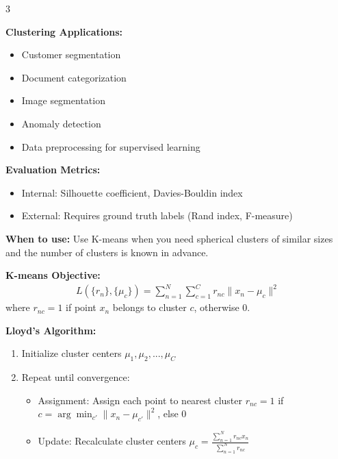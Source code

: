 \documentclass[10pt,landscape]{article}
\begin{document}
\begin{multicols}{3}
\begin{tcolorbox}[breakable, title=5. Clustering Concepts, colback=clustering]
\textbf{Clustering Applications:}
\begin{itemize}[leftmargin=*,noitemsep,topsep=0pt]
    \item Customer segmentation
    \item Document categorization
    \item Image segmentation
    \item Anomaly detection
    \item Data preprocessing for supervised learning
\end{itemize}

\textbf{Evaluation Metrics:}
\begin{itemize}[leftmargin=*,noitemsep,topsep=0pt]
    \item Internal: Silhouette coefficient, Davies-Bouldin index
    \item External: Requires ground truth labels (Rand index, F-measure)
\end{itemize}
\end{tcolorbox}

\begin{tcolorbox}[breakable, title=5.1 K-means Clustering, colback=clustering]
\textbf{When to use:} Use K-means when you need spherical clusters of similar sizes and the number of clusters is known in advance.

\textbf{K-means Objective:}
\begin{align}
L(\{r_n\}, \{\mu_c\}) = \sum_{n=1}^N\sum_{c=1}^C r_{nc}\|x_n - \mu_c\|^2
\end{align}
where $r_{nc} = 1$ if point $x_n$ belongs to cluster $c$, otherwise 0.

\textbf{Lloyd's Algorithm:}
\begin{enumerate}[leftmargin=*,noitemsep,topsep=0pt]
    \item Initialize cluster centers $\mu_1, \mu_2, ..., \mu_C$
    \item Repeat until convergence:
    \begin{itemize}[leftmargin=*,noitemsep]
        \item Assignment: Assign each point to nearest cluster
        $r_{nc} = 1$ if $c = \arg\min_{c'} \|x_n - \mu_{c'}\|^2$, else 0
        \item Update: Recalculate cluster centers
        $\mu_c = \frac{\sum_{n=1}^N r_{nc}x_n}{\sum_{n=1}^N r_{nc}}$
    \end{itemize}
\end{enumerate}


\end{tcolorbox}
\end{multicols}
\end{document}

